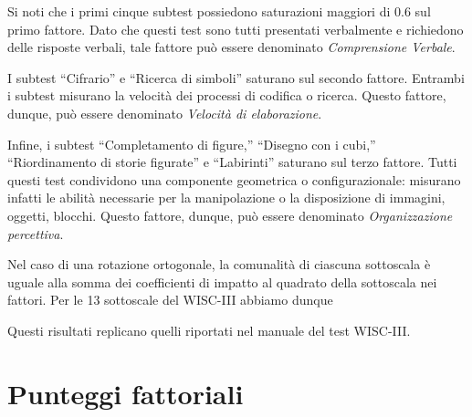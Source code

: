 \documentclass[
  11pt,
]{krantz}
\makeatletter
\newenvironment{Shaded}{\begin{snugshade}}{\end{snugshade}}
\newcommand{\CommentTok}[1]{\textcolor[rgb]{0.37,0.37,0.37}{\textit{#1}}}
\newcommand{\ControlFlowTok}[1]{\textcolor[rgb]{0.27,0.27,0.27}{\textbf{#1}}}
\newcommand{\DecValTok}[1]{\textcolor[rgb]{0.06,0.06,0.06}{#1}}
\newcommand{\FunctionTok}[1]{\textcolor[rgb]{0,0,0}{#1}}
\newcommand{\NormalTok}[1]{#1}
\newcommand{\OtherTok}[1]{\textcolor[rgb]{0.37,0.37,0.37}{#1}}
\newcommand{\SpecialCharTok}[1]{\textcolor[rgb]{0,0,0}{#1}}
\newenvironment{kframe}{%
\medskip{}
\setlength{\fboxsep}{.8em}
 \def\at@end@of@kframe{}%
 \ifinner\ifhmode%
  \def\at@end@of@kframe{\end{minipage}}%
  \begin{minipage}{\columnwidth}%
 \fi\fi%
 \def\FrameCommand##1{\hskip\@totalleftmargin \hskip-\fboxsep
 \colorbox{shadecolor}{##1}\hskip-\fboxsep
     \hskip-\linewidth \hskip-\@totalleftmargin \hskip\columnwidth}%
 \MakeFramed {\advance\hsize-\width
   \@totalleftmargin\z@ \linewidth\hsize
   \@setminipage}}%
 {\par\unskip\endMakeFramed%
 \at@end@of@kframe}
\renewenvironment{Shaded}{\begin{kframe}}{\end{kframe}}
\theoremstyle{definition}
\theoremstyle{definition}
\theoremstyle{definition}
\theoremstyle{definition}
\theoremstyle{remark}
\makeatother
\begin{document}
Si noti che i primi cinque subtest possiedono saturazioni maggiori di \(0.6\) sul primo fattore. Dato che questi test sono tutti presentati verbalmente e richiedono delle risposte verbali, tale fattore può essere denominato \emph{Comprensione Verbale}.

I subtest ``Cifrario'' e ``Ricerca di simboli'' saturano sul secondo fattore. Entrambi i subtest misurano la velocità dei processi di codifica o ricerca. Questo fattore, dunque, può essere denominato \emph{Velocità di elaborazione}.

Infine, i subtest ``Completamento di figure,'' ``Disegno con i cubi,'' ``Riordinamento di storie figurate'' e ``Labirinti'' saturano sul terzo fattore. Tutti questi test condividono una componente geometrica o configurazionale: misurano infatti le abilità necessarie per la manipolazione o la disposizione di immagini, oggetti, blocchi. Questo fattore, dunque, può essere denominato \emph{Organizzazione percettiva}.

Nel caso di una rotazione ortogonale, la comunalità di ciascuna sottoscala è uguale alla somma dei coefficienti di impatto al quadrato della sottoscala nei fattori. Per le 13 sottoscale del WISC-III abbiamo dunque

\begin{Shaded}
\end{Shaded}

Questi risultati replicano quelli riportati nel manuale del test WISC-III.

\hypertarget{punteggi-fattoriali}{%
\section{Punteggi fattoriali}\label{punteggi-fattoriali}}
\end{document}
